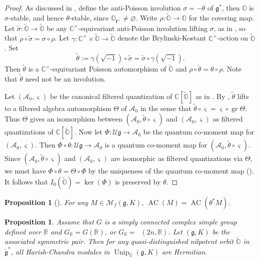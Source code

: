 \documentclass[11pt, a4paper]{amsart}
\newcommand{\C}{\mathbb{C}}
\newcommand{\g}{\mathfrak{g}}
\newcommand{\orb}{\mathbb{O}}
\newcommand{\gr}{\operatorname{gr}}
\newcommand{\fg}{\mathfrak{g}}
\newcommand{\fk}{\mathfrak{k}}
\newcommand{\ckfg}{{\check{\fg}}}
\newcommand{\ckorb}{\check{\orb}}
\newcommand{\cA}{\mathcal{A}}
\newcommand{\cM}{\mathcal{M}}
\newcommand{\cU}{\mathcal{U}}
\newcommand{\Ug}{\cU\fg}
\DeclareMathOperator{\AC}{AC}
\DeclareMathOperator{\Unip}{Unip}
\DeclareMathOperator{\Mp}{\widetilde{Sp}}
\newcommand{\UnipOv}{\Unip_{\ckorb}}
\newcommand{\R}{\mathbb{R}}
\newcommand{\cm}{\C^\times}
\newcommand{\GR}{G_\R}
\newtheorem{Prop}[Thm]{Proposition}
\theoremstyle{definition}
\numberwithin{equation}{section}
\begin{document}
\begin{proof}
	As discussed in , define the anti-Poisson involution $\sigma=-\theta$ of $\fg^*$, then $\orb$ is $\sigma$-stable, and hence $\theta$-stable, since $\orb_{\fk^\perp} \neq \varnothing$. Write $\rho:\widetilde{\orb} \to \orb$ for the covering map. Let $\tilde{\sigma}: \widetilde{\orb} \to \widetilde{\orb}$ be any $\cm$-equivariant anti-Poisson involution lifting $\sigma$, as in , so that $\rho \circ \tilde{\sigma} = \sigma \circ \rho$. Let $\gamma: \cm \times \widetilde{\orb} \to \widetilde{\orb}$ denote the Brylinski-Kostant $\cm$-action on $\widetilde{\orb}$. Set 
		\[ \tilde{\theta} := \gamma(\sqrt{-1}) \circ \tilde{\sigma} = \tilde{\sigma} \circ \gamma(\sqrt{-1}). \]
	Then $\tilde{\theta}$ is a $\cm$-equivariant Poisson automorphism of $\widetilde{\orb}$ and $\rho \circ \tilde{\theta} = \theta \circ \rho$. Note that $\tilde{\theta}$ need not be an involution.	

	Let $(\cA_0, \varsigma)$ be the canonical filtered quantization of $\C[\widetilde{\orb}]$ as in . By \cite[Proposition 5.1.1]{LMBM}, $\tilde{\theta}$ lifts to a filtered algebra automorphism $\Theta$ of $\cA_0$ in the sense that $\tilde{\theta} \circ \varsigma = \varsigma \circ \gr \Theta$. Thus $\Theta$ gives an isomorphism between $(\cA_0, \tilde{\theta} \circ \varsigma)$ and $(\cA_0, \varsigma)$ as filtered quantizations of $\C[\widetilde{\orb}]$.
	Now let $\Phi: \Ug \to \cA_0$ be the quantum co-moment map for $(\cA_0, \varsigma)$. Then $\Phi \circ \theta: \Ug \to \cA_0$ is a quantum co-moment map for $(\cA_0, \tilde{\theta} \circ \varsigma)$. Since $(\cA_0, \tilde{\theta} \circ \varsigma)$ and $(\cA_0, \varsigma)$ are isomorphic as filtered quantizations via $\Theta$, we must have $\Phi \circ \theta = \Theta \circ \Phi$ by the uniqueness of the quantum co-moment map (). It follows that $I_0(\widetilde{\orb}) = \ker(\Phi)$ is preserved by $\theta$.
\end{proof}


\begin{Prop}[{\cite[Proposition 5.17]{DMB-Hodge}}] \label{prop:AC_theta}
	For any $M \in \cM_f(\fg,K)$, $\AC(M) = \AC(\theta^*M)$.
\end{Prop}

\begin{Prop} \label{prop:Hermitian_UnipOv}
	Assume that $G$ is a simply connected complex simple group defined over $\R$ and $\GR=G(\R)$, or $\GR = \Mp(2n, \R)$. Let $(\g,K)$ be the associated symmetric pair. Then for any quasi-distinguished nilpotent orbit $\ckorb$ in $\ckfg^*$, all Harish-Chandra modules in $\UnipOv(\g, K)$ are Hermitian.
\end{Prop}
\end{document}
